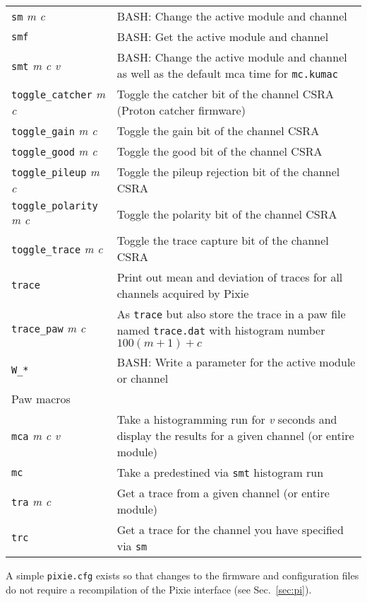 \documentclass[10pt]{article}
\begin{document}
\begin{longtable}{lp{4.5in}}
\texttt{sm} {\it m c} & \textsc{BASH:} Change the active module and channel \\
\texttt{smf} & \textsc{BASH:} Get the active module and channel \\
\texttt{smt} {\it m c v} & \textsc{BASH:} Change the active module and channel 
as well as the default mca time for \texttt{mc.kumac} \\
\texttt{toggle\_catcher} {\it m c} & Toggle the catcher bit of the channel 
CSRA (Proton catcher firmware)\\
\texttt{toggle\_gain} {\it m c} & Toggle the gain bit of the channel CSRA\\
\texttt{toggle\_good} {\it m c} & Toggle the good bit of the channel CSRA\\
\texttt{toggle\_pileup} {\it m c} & Toggle the pileup rejection bit of the 
channel CSRA\\
\texttt{toggle\_polarity} {\it m c} & Toggle the polarity bit of the channel 
CSRA\\
\texttt{toggle\_trace} {\it m c} & Toggle the trace capture bit of the channel 
CSRA\\
\texttt{trace} & Print out mean and deviation of traces for all channels 
acquired by Pixie \\
\texttt{trace\_paw} {\it m c} & As \texttt{trace} but also store the trace in 
a paw file named \texttt{trace.dat} with histogram number $100(m+1) + c$ \\
\texttt{W\_*} & \textsc{BASH:} Write a parameter for the active module or
channel \\
\hline
Paw macros & \\
\hline
\texttt{mca} {\it m c v} & Take a histogramming run for {\it v} seconds and
display the results for a given channel (or entire module) \\
\texttt{mc}  & Take a predestined via \texttt{smt} histogram run \\
\texttt{tra} {\it m c} & Get a trace from a given channel (or entire module)
\\
\texttt{trc} & Get a trace for the channel you have specified via \texttt{sm} \\
\end{longtable}
A simple \texttt{pixie.cfg} exists so that changes to the firmware and 
configuration files do not require a recompilation of the Pixie interface (see 
Sec.~\ref{sec:pi}).
\end{document}
